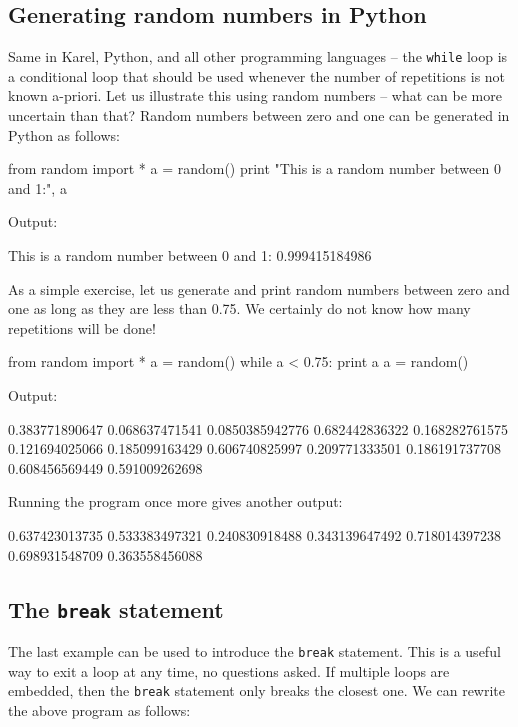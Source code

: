 \subsection{Generating random numbers in Python}

Same in Karel, Python, and all other programming 
languages -- the {\tt while} loop is a conditional loop that should be used whenever the number of repetitions 
is not known a-priori. Let us illustrate this using random numbers -- what can be more uncertain than that?
Random numbers between 
zero and one can be generated in Python as follows:

\begin{bluecode}
from random import *
a = random()
print "This is a random number between 0 and 1:", a
\end{bluecode}
Output:

\begin{bluecode}
This is a random number between 0 and 1: 0.999415184986
\end{bluecode}
As a simple exercise, let us generate and print random numbers between 
zero and one as long as they are less than 0.75. We certainly do not know 
how many repetitions will be done!

\begin{bluecode}
from random import *
a = random()
while a < 0.75:
    print a
    a = random()
\end{bluecode}
Output:

\begin{bluecode}
0.383771890647
0.068637471541
0.0850385942776
0.682442836322
0.168282761575
0.121694025066
0.185099163429
0.606740825997
0.209771333501
0.186191737708
0.608456569449
0.591009262698
\end{bluecode}
Running the program once more gives another output:

\begin{bluecode}
0.637423013735
0.533383497321
0.240830918488
0.343139647492
0.718014397238
0.698931548709
0.363558456088
\end{bluecode}

\subsection{The {\tt break} statement}

The last example can be used to 
introduce the {\tt break} statement. This is a useful way to exit a loop at any time,
no questions asked.
If multiple loops are embedded, then the {\tt break} statement only breaks the closest 
one. We can rewrite the above program as follows: 

